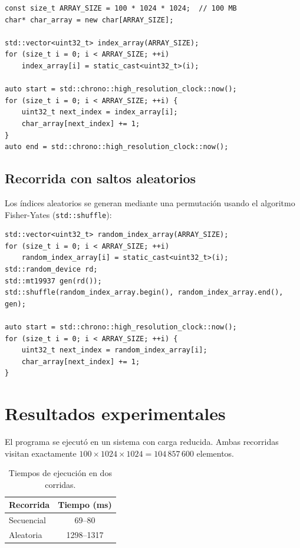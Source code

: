 \documentclass[11pt,a4paper]{article}
\begin{document}
\begin{lstlisting}[caption={Reserva y recorrida secuencial}]
const size_t ARRAY_SIZE = 100 * 1024 * 1024;  // 100 MB
char* char_array = new char[ARRAY_SIZE];

std::vector<uint32_t> index_array(ARRAY_SIZE);
for (size_t i = 0; i < ARRAY_SIZE; ++i)
    index_array[i] = static_cast<uint32_t>(i);

auto start = std::chrono::high_resolution_clock::now();
for (size_t i = 0; i < ARRAY_SIZE; ++i) {
    uint32_t next_index = index_array[i];
    char_array[next_index] += 1;
}
auto end = std::chrono::high_resolution_clock::now();
\end{lstlisting}

\subsection{Recorrida con saltos aleatorios}

Los índices aleatorios se generan mediante una permutación usando el algoritmo Fisher-Yates (\texttt{std::shuffle}):

\begin{lstlisting}[caption={Indices aleatorios y recorrida}]
std::vector<uint32_t> random_index_array(ARRAY_SIZE);
for (size_t i = 0; i < ARRAY_SIZE; ++i)
    random_index_array[i] = static_cast<uint32_t>(i);
std::random_device rd;
std::mt19937 gen(rd());
std::shuffle(random_index_array.begin(), random_index_array.end(), gen);

auto start = std::chrono::high_resolution_clock::now();
for (size_t i = 0; i < ARRAY_SIZE; ++i) {
    uint32_t next_index = random_index_array[i];
    char_array[next_index] += 1;
}
\end{lstlisting}

\section{Resultados experimentales}

El programa se ejecutó en un sistema con carga reducida. Ambas recorridas visitan exactamente \(100 \times 1024 \times 1024 = 104\,857\,600\) elementos.

\begin{table}[h]
\centering
\begin{tabular}{@{}lc@{}}
\toprule
\textbf{Recorrida} & \textbf{Tiempo (ms)} \\
\midrule
Secuencial         & 69--80                \\
Aleatoria          & 1298--1317            \\
\bottomrule
\end{tabular}
\caption{Tiempos de ejecución en dos corridas.}
\label{tab:tiempos}
\end{table}
\end{document}
